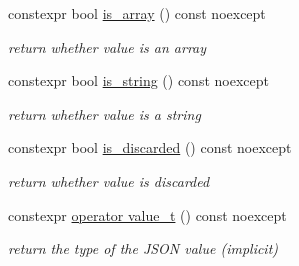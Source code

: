 \begin{DoxyCompactItemize}
constexpr bool \hyperlink{classnlohmann_1_1basic__json_a256a4cef002023acab3c9d75b569f54a}{is\-\_\-array} () const noexcept
\begin{DoxyCompactList}\small\item\em return whether value is an array \end{DoxyCompactList}\item 
constexpr bool \hyperlink{classnlohmann_1_1basic__json_a409e854d754f5684b2cce74ee20dbc3b}{is\-\_\-string} () const noexcept
\begin{DoxyCompactList}\small\item\em return whether value is a string \end{DoxyCompactList}\item 
constexpr bool \hyperlink{classnlohmann_1_1basic__json_a1002d187e05b5323bda5de124cbe95a8}{is\-\_\-discarded} () const noexcept
\begin{DoxyCompactList}\small\item\em return whether value is discarded \end{DoxyCompactList}\item 
constexpr \hyperlink{classnlohmann_1_1basic__json_a02397f02bb1182bf1e1bc7ecf7f2c227}{operator value\-\_\-t} () const noexcept
\begin{DoxyCompactList}\small\item\em return the type of the J\-S\-O\-N value (implicit) \end{DoxyCompactList}\end{DoxyCompactItemize}
